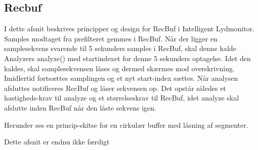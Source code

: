 \newpage
\subsection{Recbuf}
I dette afsnit beskrives principper og design for RecBuf i Intelligent Lydmonitor.
Samples modtaget fra prefilteret gemmes i RecBuf. Når der ligger en samplesekvens svarende til 5 sekunders samples i RecBuf, skal denne kalde Analyzers analyze() med startindexet for denne 5 sekunders optagelse. Idet den kaldes, skal samplesekvensen låses og dermed skærmes mod overskrivning. Imidlertid fortsættes samplingen og et nyt start-index sættes. Når analysen afsluttes notificeres RecBuf og låser sekvensen op. Det opstår således et hastigheds-krav til analyze og et størrelseskrav til RecBuf, idet analyze skal afslutte inden RecBuf når den låste sekvens igen. 

Herunder ses en princip-skitse for en cirkulær buffer med låsning af segmenter.

Dette afsnit er endnu ikke færdigt
